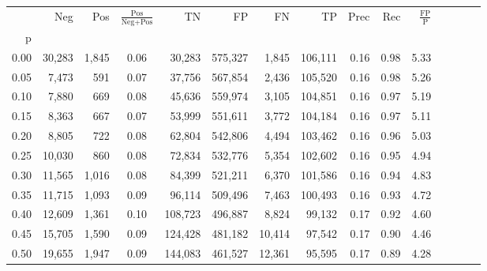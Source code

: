 \begin{tabular}{rrrcrrrrrrrrrrr}
\toprule
{} &     Neg &     Pos & $\frac{\text{Pos}}{\text{Neg}+\text{Pos}}$ &       TN &       FP &       FN &       TP &  Prec &   Rec & $\frac{\text{FP}}{\text{P}}$ \\
p    &         &         &                                            &          &          &          &          &       &       &                              \\
\midrule
0.00 &  30,283 &   1,845 &                                       0.06 &   30,283 &  575,327 &    1,845 &  106,111 &  0.16 &  0.98 &                         5.33 \\
0.05 &   7,473 &     591 &                                       0.07 &   37,756 &  567,854 &    2,436 &  105,520 &  0.16 &  0.98 &                         5.26 \\
0.10 &   7,880 &     669 &                                       0.08 &   45,636 &  559,974 &    3,105 &  104,851 &  0.16 &  0.97 &                         5.19 \\
0.15 &   8,363 &     667 &                                       0.07 &   53,999 &  551,611 &    3,772 &  104,184 &  0.16 &  0.97 &                         5.11 \\
0.20 &   8,805 &     722 &                                       0.08 &   62,804 &  542,806 &    4,494 &  103,462 &  0.16 &  0.96 &                         5.03 \\
0.25 &  10,030 &     860 &                                       0.08 &   72,834 &  532,776 &    5,354 &  102,602 &  0.16 &  0.95 &                         4.94 \\
0.30 &  11,565 &   1,016 &                                       0.08 &   84,399 &  521,211 &    6,370 &  101,586 &  0.16 &  0.94 &                         4.83 \\
0.35 &  11,715 &   1,093 &                                       0.09 &   96,114 &  509,496 &    7,463 &  100,493 &  0.16 &  0.93 &                         4.72 \\
0.40 &  12,609 &   1,361 &                                       0.10 &  108,723 &  496,887 &    8,824 &   99,132 &  0.17 &  0.92 &                         4.60 \\
0.45 &  15,705 &   1,590 &                                       0.09 &  124,428 &  481,182 &   10,414 &   97,542 &  0.17 &  0.90 &                         4.46 \\
0.50 &  19,655 &   1,947 &                                       0.09 &  144,083 &  461,527 &   12,361 &   95,595 &  0.17 &  0.89 &                         4.28 \\

\end{tabular}
